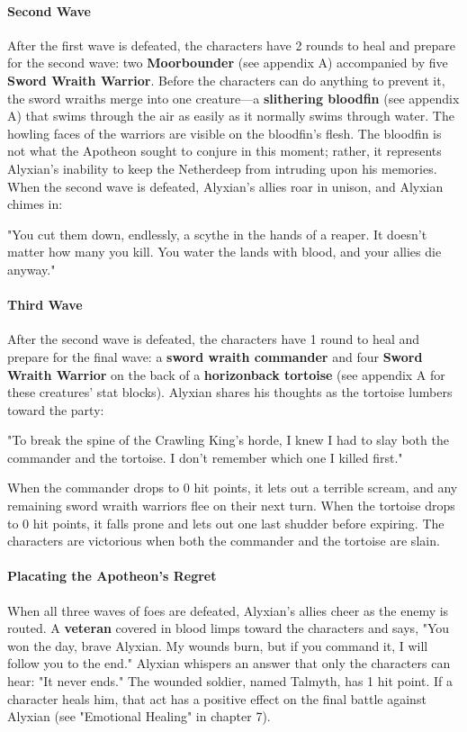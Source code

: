 \documentclass[10pt,a4,twoside,twocolumn,openany,nodeprecatedcode]{dndbook}
\begin{document}
\paragraph{Second Wave}
After the first wave is defeated, the characters have 2 rounds to heal and prepare for the second wave: two \textbf{Moorbounder} (see appendix A) accompanied by five \textbf{Sword Wraith Warrior}. Before the characters can do anything to prevent it, the sword wraiths merge into one creature—a \textbf{slithering bloodfin} (see appendix A) that swims through the air as easily as it normally swims through water. The howling faces of the warriors are visible on the bloodfin's flesh. The bloodfin is not what the Apotheon sought to conjure in this moment; rather, it represents Alyxian's inability to keep the Netherdeep from intruding upon his memories.
When the second wave is defeated, Alyxian's allies roar in unison, and Alyxian chimes in:
\begin{DndReadAloud}{}
"You cut them down, endlessly, a scythe in the hands of a reaper. It doesn't matter how many you kill. You water the lands with blood, and your allies die anyway."
\end{DndReadAloud}

\paragraph{Third Wave}
After the second wave is defeated, the characters have 1 round to heal and prepare for the final wave: a \textbf{sword wraith commander} and four \textbf{Sword Wraith Warrior} on the back of a \textbf{horizonback tortoise} (see appendix A for these creatures' stat blocks). Alyxian shares his thoughts as the tortoise lumbers toward the party:
\begin{DndReadAloud}{}
"To break the spine of the Crawling King's horde, I knew I had to slay both the commander and the tortoise. I don't remember which one I killed first."
\end{DndReadAloud}

When the commander drops to 0 hit points, it lets out a terrible scream, and any remaining sword wraith warriors flee on their next turn. When the tortoise drops to 0 hit points, it falls prone and lets out one last shudder before expiring. The characters are victorious when both the commander and the tortoise are slain.
\paragraph{Placating the Apotheon's Regret}
When all three waves of foes are defeated, Alyxian's allies cheer as the enemy is routed. A \textbf{veteran} covered in blood limps toward the characters and says, "You won the day, brave Alyxian. My wounds burn, but if you command it, I will follow you to the end." Alyxian whispers an answer that only the characters can hear: "It never ends." The wounded soldier, named Talmyth, has 1 hit point. If a character heals him, that act has a positive effect on the final battle against Alyxian (see "Emotional Healing" in chapter 7).
\end{document}
